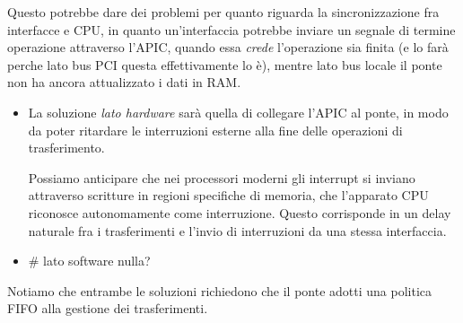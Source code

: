 \documentclass[a4paper,11pt]{article}
\begin{document}
Questo potrebbe dare dei problemi per quanto riguarda la sincronizzazione fra interfacce e CPU, in quanto un'interfaccia potrebbe inviare un segnale di termine operazione attraverso l'APIC, quando essa \textit{crede} l'operazione sia finita (e lo farà perche lato bus PCI questa effettivamente lo è), mentre lato bus locale il ponte non ha ancora attualizzato i dati in RAM.
\begin{itemize}
	\item La soluzione \textit{lato hardware} sarà quella di collegare l'APIC al ponte, in modo da poter ritardare le interruzioni esterne alla fine delle operazioni di trasferimento.

		Possiamo anticipare che nei processori moderni gli interrupt si inviano attraverso scritture in regioni specifiche di memoria, che l'apparato CPU riconosce autonomamente come interruzione.
		Questo corrisponde in un delay naturale fra i trasferimenti e l'invio di interruzioni da una stessa interfaccia.
	\item # lato software nulla?
\end{itemize}

Notiamo che entrambe le soluzioni richiedono che il ponte adotti una politica FIFO alla gestione dei trasferimenti.
\end{document}
